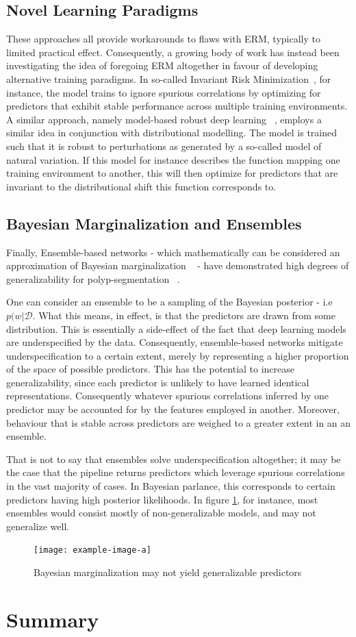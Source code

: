 \subsection{Novel Learning Paradigms}
These approaches all provide workarounds to flaws with ERM, typically to limited practical effect. Consequently, a growing body of work has instead been investigating the idea of foregoing ERM altogether in favour of developing alternative training paradigms. In so-called Invariant Risk Minimization~\cite{IRM}, for instance, the model trains to ignore spurious correlations by optimizing for predictors that exhibit stable performance across multiple training environments. A similar approach, namely model-based robust deep learning ~\cite{modelbased}, employs a similar idea in conjunction with distributional modelling. The model is trained such that it is robust to perturbations as generated by a so-called model of natural variation. If this model for instance describes the function mapping one training environment to another, this will then optimize for predictors that are invariant to the distributional shift this function corresponds to. 

\subsection{Bayesian Marginalization and Ensembles}
Finally, Ensemble-based networks - which mathematically can be considered an approximation of Bayesian marginalization ~\cite{bayesian_case,bayesian_generalization} - have demonstrated high degrees of generalizability for polyp-segmentation ~\cite{divergentnets,endoensemble}. 

One can consider an ensemble to be a sampling of the Bayesian posterior - i.e \(p(w | \mathcal{D}\). What this means, in effect, is that the predictors are drawn from some distribution. This is essentially a side-effect of the fact that deep learning models are underspecified by the data. Consequently, ensemble-based networks mitigate underspecification to a certain extent, merely by representing a higher proportion of the space of possible predictors. This has the potential to increase generalizability, since each predictor is unlikely to have learned identical representations. Consequently whatever spurious correlations inferred by one predictor may be accounted for by the features employed in another. Moreover, behaviour that is stable across predictors are weighed to a greater extent in an an ensemble.

That is not to say that ensembles solve underspecification altogether; it may be the case that the pipeline returns predictors which leverage spurious correlations in the vast majority of cases. In Bayesian parlance, this corresponds to certain predictors having high posterior likelihoods. In figure \ref{fig:bayesian_generalization}, for instance, most ensembles would consist mostly of non-generalizable models, and may not generalize well. 
\begin{figure}
    \centering
    \texttt{[image: example-image-a]}
    \caption{Bayesian marginalization may not yield generalizable predictors}
    \label{fig:bayesian_generalization}
\end{figure}
\section{Summary}

